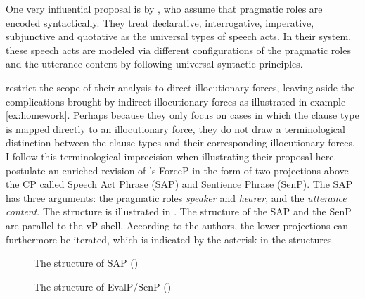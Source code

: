 One very influential proposal is by \citet{SpeasTenny2003}, who assume that pragmatic roles are encoded syntactically. They treat declarative, interrogative,
imperative, subjunctive and quotative  as the universal types of speech acts. In their system, these speech acts are modeled via different configurations of the
pragmatic roles and the utterance content by following universal syntactic principles.

\citet{SpeasTenny2003} restrict the scope of their analysis to direct illocutionary forces,
leaving aside the complications brought by indirect illocutionary forces as illustrated in  example
\eqref{ex:homework}. Perhaps because they only focus on cases in which the clause type is mapped directly to an illocutionary force, they do not draw a terminological
distinction between the clause types and their corresponding illocutionary forces. I
follow this terminological imprecision when illustrating their proposal here. \citet{SpeasTenny2003}  postulate an enriched revision of \citeauthor{Rizzi1997}'s  ForceP in the form of two
projections above the CP called Speech Act Phrase (SAP) and Sentience Phrase (SenP).
The SAP has three arguments: the pragmatic  roles  \emph{speaker} and \emph{hearer},  and the
 \emph{utterance content}. The structure is illustrated in . The structure of the SAP and
the SenP are parallel to the vP shell. According to the authors, the lower projections
can furthermore be iterated, which is indicated by the asterisk in the structures.

\begin{figure}\small
\begin{floatrow}\captionsetup{margin=.05\linewidth}
{\caption{\label{struc:speastennya}The structure of SAP (\citealt[320: ex 9]{SpeasTenny2003}) }}
{\caption{\label{struc:speastennyb}The structure of EvalP/SenP (\citealt[334: ex 34]{SpeasTenny2003})}}
\end{floatrow}
\end{figure} 

